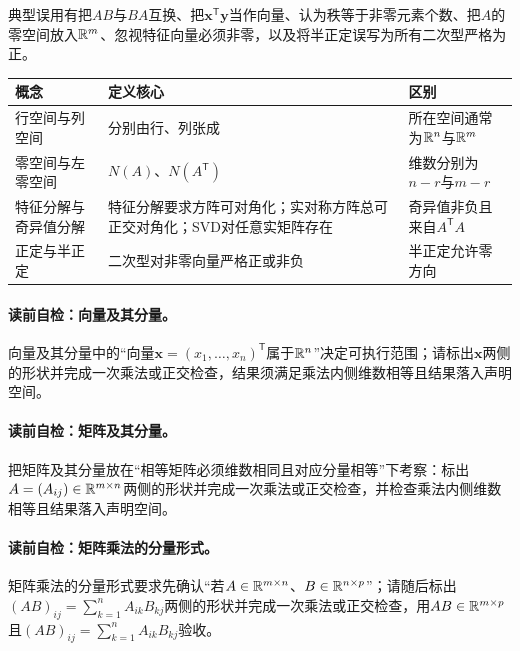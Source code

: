 \begin{warningbox}\label{schema:V1-C02:CH-30}
典型误用有把$AB$与$BA$互换、把$\boldsymbol{x}^{\mathsf T}\boldsymbol{y}$当作向量、认为秩等于非零元素个数、把$A$的零空间放入$\mathbb{R}^m$、忽视特征向量必须非零，以及将半正定误写为所有二次型严格为正。
\end{warningbox}
\begin{comparisonbox}\label{schema:V1-C02:CH-31}
\begin{tabularx}{\linewidth}{@{}lXX@{}}
\toprule
概念 & 定义核心 & 区别\\
\midrule
行空间与列空间 & 分别由行、列张成 & 所在空间通常为$\mathbb{R}^n$与$\mathbb{R}^m$\\
零空间与左零空间 & $N(A)$、$N(A^{\mathsf T})$ & 维数分别为$n-r$与$m-r$\\
特征分解与奇异值分解 & 特征分解要求方阵可对角化；实对称方阵总可正交对角化；SVD对任意实矩阵存在 & 奇异值非负且来自$A^{\mathsf T}A$\\
正定与半正定 & 二次型对非零向量严格正或非负 & 半正定允许零方向\\
\bottomrule
\end{tabularx}
\end{comparisonbox}

\paragraph{读前自检：向量及其分量。}向量及其分量中的“向量$\boldsymbol{x}=(x_1,\ldots,x_n)^{\mathsf T}$属于$\mathbb{R}^n$”决定可执行范围；请标出$\boldsymbol{x}$两侧的形状并完成一次乘法或正交检查，结果须满足乘法内侧维数相等且结果落入声明空间。\par
\paragraph{读前自检：矩阵及其分量。}把矩阵及其分量放在“相等矩阵必须维数相同且对应分量相等”下考察：标出$A=(A_{ij})\in\mathbb{R}^{m\times n}$两侧的形状并完成一次乘法或正交检查，并检查乘法内侧维数相等且结果落入声明空间。\par
\paragraph{读前自检：矩阵乘法的分量形式。}矩阵乘法的分量形式要求先确认“若$A\in\mathbb{R}^{m\times n}$、$B\in\mathbb{R}^{n\times p}$”；请随后标出$(AB)_{ij}=\sum_{k=1}^{n}A_{ik}B_{kj}$两侧的形状并完成一次乘法或正交检查，用$AB\in\mathbb{R}^{m\times p}$且$(AB)_{ij}=\sum_{k=1}^{n}A_{ik}B_{kj}$验收。\par
